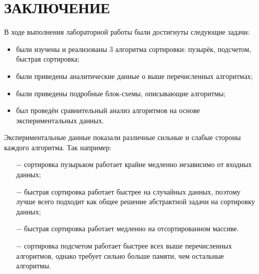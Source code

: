\chapter*{ЗАКЛЮЧЕНИЕ}

В ходе выполнения лабораторной работы были достигнуты следующие задачи:

\begin{itemize}
    \item были изучены и реализованы 3 алгоритма сортировки: пузырёк, подсчетом, быстрая сортировка;
    \item были приведены аналитические данные о выше перечисленных алгоритмах;
    \item были приведены подробные блок-схемы, описывающие алгоритмы;
    \item был проведён сравнительный анализ алгоритмов на основе экспериментальных данных.
\end{itemize}

Экспериментальные данные показали различные сильные и слабые стороны каждого алгоритма.
Так например:
\begin{itemize}
    \item[$-$] сортировка пузырьком работает крайне медленно независимо от входных данных;
    \item[$-$] быстрая сортировка работает быстрее на случайных данных, поэтому лучше всего подходит как общее решение абстрактной задачи на сортировку данных;
    \item[$-$] быстрая сортировка работает медленно на отсортированном массиве.
    \item[$-$] сортировка подсчетом работает быстрее всех выше перечисленных алгоритмов, однако требует сильно больше памяти, чем остальные алгоритмы.
\end{itemize}
